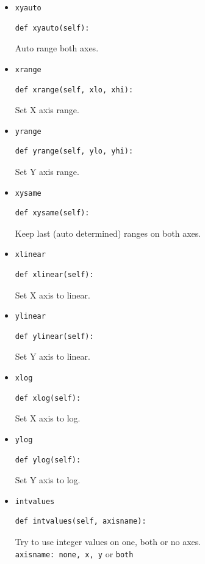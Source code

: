 \documentclass[a4paper,twoside,11pt]{article}
\begin{document}
\begin{itemize}
\item{\texttt{xyauto}}\\
\begin{lstlisting}
def xyauto(self):
\end{lstlisting}
Auto range both axes.

\item{\texttt{xrange}}\\
\begin{lstlisting}
def xrange(self, xlo, xhi):
\end{lstlisting}
Set X axis range.

\item{\texttt{yrange}}\\
\begin{lstlisting}
def yrange(self, ylo, yhi):
\end{lstlisting}
Set Y axis range.

\item{\texttt{xysame}}\\
\begin{lstlisting}
def xysame(self):
\end{lstlisting}
Keep last (auto determined) ranges on both axes.

\item{\texttt{xlinear}}\\
\begin{lstlisting}
def xlinear(self):
\end{lstlisting}
Set X axis to linear.

\item{\texttt{ylinear}}\\
\begin{lstlisting}
def ylinear(self):
\end{lstlisting}
Set Y axis to linear.

\item{\texttt{xlog}}\\
\begin{lstlisting}
def xlog(self):
\end{lstlisting}
Set X axis to log.

\item{\texttt{ylog}}\\
\begin{lstlisting}
def ylog(self):
\end{lstlisting}
Set Y axis to log.

\item{\texttt{intvalues}}\\
\begin{lstlisting}
def intvalues(self, axisname):
\end{lstlisting}
  Try to use integer values on one, both or no axes.\\
  \texttt{axisname: none, x, y} or \texttt{both}


\end{itemize}
\end{document}
